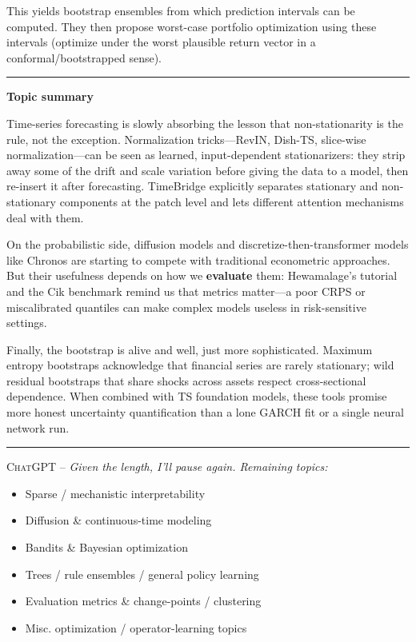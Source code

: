 \documentclass[a5paper]{article}
\providecommand{\tightlist}{%
  \setlength{\itemsep}{0pt}\setlength{\parskip}{0pt}}
\def\subsection#1{{\par\bigskip\goodbreak\large\bfseries #1\par}}
\begin{document}
This yields bootstrap ensembles from which prediction intervals can be
computed. They then propose worst-case portfolio optimization using
these intervals (optimize under the worst plausible return vector in a
conformal/bootstrapped sense).

\begin{center}\rule{0.5\linewidth}{0.5pt}\end{center}

\subsection{Topic summary}\label{topic-summary-8}

Time-series forecasting is slowly absorbing the lesson that
non-stationarity is the rule, not the exception. Normalization
tricks---RevIN, Dish-TS, slice-wise normalization---can be seen as
learned, input-dependent stationarizers: they strip away some of the
drift and scale variation before giving the data to a model, then
re-insert it after forecasting. TimeBridge explicitly separates
stationary and non-stationary components at the patch level and lets
different attention mechanisms deal with them.

On the probabilistic side, diffusion models and
discretize-then-transformer models like Chronos are starting to compete
with traditional econometric approaches. But their usefulness depends on
how we \textbf{evaluate} them: Hewamalage's tutorial and the Cik
benchmark remind us that metrics matter---a poor CRPS or miscalibrated
quantiles can make complex models useless in risk-sensitive settings.

Finally, the bootstrap is alive and well, just more sophisticated.
Maximum entropy bootstraps acknowledge that financial series are rarely
stationary; wild residual bootstraps that share shocks across assets
respect cross-sectional dependence. When combined with TS foundation
models, these tools promise more honest uncertainty quantification than
a lone GARCH fit or a single neural network run.

\begin{center}\rule{0.5\linewidth}{0.5pt}\end{center}

\textsc{ChatGPT --}
\itshape
Given the length, I'll pause again. Remaining topics:

\begin{itemize}
\tightlist
\item
  Sparse / mechanistic interpretability
\item
  Diffusion \& continuous-time modeling
\item
  Bandits \& Bayesian optimization
\item
  Trees / rule ensembles / general policy learning
\item
  Evaluation metrics \& change-points / clustering
\item
  Misc. optimization / operator-learning topics
\end{itemize}
\upshape
\end{document}
